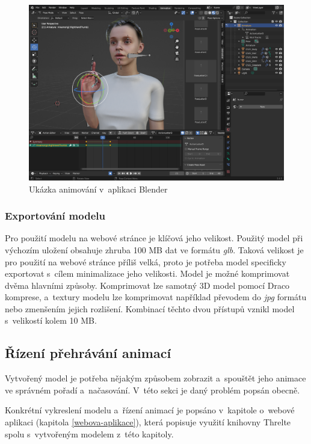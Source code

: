 \documentclass[
  master,
  program=ainfvs,
  biblatex,
  figures=true,
  tables=false,
  sourcecodes=true,
  glossaries,
  index
]{kidiplom}
\begin{document}
             \begin{figure}[htbp]
                \centering
                \includegraphics[width=1\columnwidth]{graphics/blender.png}
                \caption{Ukázka animování v~aplikaci Blender}
                \label{blender}
            \end{figure}
                
            \subsubsection{Exportování modelu}
                Pro použití modelu na webové stránce je klíčová jeho velikost. Použitý model při výchozím uložení obsahuje zhruba 100 MB dat ve formátu \emph{glb}. Taková velikost je pro použití na webové stránce příliš velká, proto je potřeba model specificky exportovat s~cílem minimalizace jeho velikosti. Model je možné komprimovat dvěma hlavními způsoby. Komprimovat lze samotný 3D model pomocí Draco komprese, a~textury modelu lze komprimovat například převodem do \emph{jpg} formátu nebo zmenšením jejich rozlišení. Kombinací těchto dvou přístupů vznikl model s~velikostí kolem 10 MB.
    
    
    \subsection{Řízení přehrávání animací}
        Vytvořený model je potřeba nějakým způsobem zobrazit a~spouštět jeho animace ve správném pořadí a~načasování. V~této sekci je daný problém popsán obecně.

        Konkrétní vykreslení modelu a~řízení animací je popsáno v~kapitole o~webové aplikaci (kapitola \ref{webova-aplikace}), která popisuje využití knihovny Threlte spolu s~vytvořeným modelem z~této kapitoly.
\end{document}

